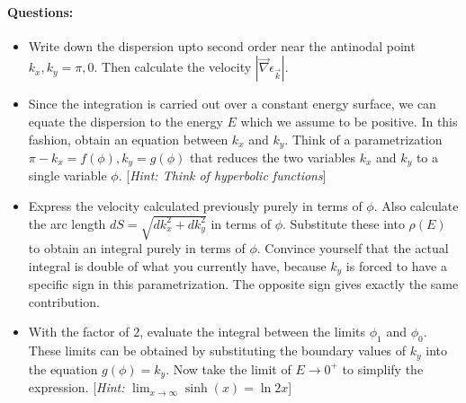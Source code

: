 \documentclass[12pt]{article}
\numberwithin{equation}{section}
\begin{document}
\paragraph{Questions:}
\begin{itemize}
	\item Write down the dispersion upto second order near the antinodal point \(k_x, k_y = \pi, 0\). Then calculate the velocity \(|\vec \nabla \epsilon_{\vec{k}}|\).
	\item Since the integration is carried out over a constant energy surface, we can equate the dispersion to the energy \(E\) which we assume to be positive. In this fashion, obtain an equation between \(k_x\) and \(k_y\). Think of a parametrization \(\pi - k_x = f(\phi), k_y = g(\phi)\) that reduces the two variables \(k_x\) and \(k_y\) to a single variable \(\phi\). [\textit{Hint: Think of hyperbolic functions}]
	\item Express the velocity calculated previously purely in terms of \(\phi\). Also calculate the arc length \(dS = \sqrt{dk_x^2 + dk_y^2}\) in terms of \(\phi\). Substitute these into \(\rho(E)\) to obtain an integral purely in terms of \(\phi\). Convince yourself that the actual integral is double of what you currently have, because \(k_y\) is forced to have a specific sign in this parametrization. The opposite sign gives exactly the same contribution.
	\item With the factor of \(2\), evaluate the integral between the limits \(\phi_1\) and \(\phi_0\). These limits can be obtained by substituting the boundary values of \(k_y\) into the equation \(g(\phi) = k_y\). Now take the limit of \(E \to 0^+\) to simplify the expression. [\textit{Hint: }\(\lim_{x \to \infty} \sinh(x) = \ln 2x\)]
\end{itemize}
\newpage
\end{document}
